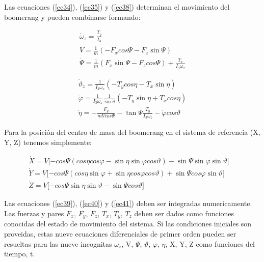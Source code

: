 	Las ecuaciones (\ref{ec34}), (\ref{ec35}) y (\ref{ec38}) determinan el movimiento del boomerang y pueden combinarse formando:

		\begin{equation}
		\begin{matrix}
		\dot{\omega}_{z}=\frac{T_{y}}{{I}_{3}}\\
		\dot{V}=\frac{1}{m}(-{F}_{x}cos{\Psi}-{F}_{z}\sin{\Psi})\\
		\dot{\Psi}=\frac{1}{m }({F}_{x}\sin{\Psi-{F}_{z}cos{\Psi}})+\frac{{T}_{x}}{{I}_{3}{\omega}_{z}}
		\end{matrix}
		\label{ec39}
		\end{equation}

		\begin{equation}
		\begin{matrix}
		 {\dot{\vartheta}}_{z}=\frac{1}{{I}_{3}{\omega}_{z}}(-{T}_{y}cos{\eta}-{T}_{x}\sin{\eta})\\
		 \dot{\varphi}=\frac{1}{{I}_{3}{\omega}_{z}}\frac{1}{\sin{\vartheta}}(-{T}_{y}\sin {\eta}+{T}_{x}cos{\eta})\\
		 \dot{\eta}=-\frac{{F}_{y}}{mVcos{\Psi}}-\tan{\Psi}\frac{T_{y}}{{I}_{3}{\omega}_{z}}-\dot{\varphi} cos{\vartheta}
		\end{matrix}
		\label{ec40}
		\end{equation}

	Para la posición del centro de masa del boomerang en el sistema de referencia (X, Y, Z) tenemos simplemente:

		\begin{equation}
		\begin{matrix}
		\dot{X} = V[{-cos{\Psi}(cos{\eta}cos{\varphi}-\sin{\eta}\sin{\varphi}cos{\vartheta})-\sin{\Psi}\sin{\varphi}\sin{\vartheta}]}\quad\\
	    \dot{Y}=V[{-cos{\Psi}\left(cos{\eta}\sin{\varphi}+\sin{\eta}cos{\varphi}cos{\vartheta}\right)+\sin{\Psi}cos{\varphi}\sin{\vartheta}]}\\
	    \dot{Z}=V[{-cos{\Psi\sin{\eta}\sin{\vartheta}-\sin{\Psi}cos{\vartheta}}]}
		\end{matrix}
		\label{ec41}
		\end{equation}

	Las ecuaciones (\ref{ec39}), (\ref{ec40}) y (\ref{ec41}) deben ser integradas numericamente. Las fuerzas y pares $F_{x}$, $F_{y}$, $F_{z}$, $T_{x}$, $T_{y}$, $T_{z}$ deben ser dados como funciones conocidas del estado de movimiento del sistema. Si las condiciones iniciales son proveidas, estas nueve ecuaciones diferenciales de primer orden pueden ser resueltas para las nueve incognitas $\omega_{z}$, V, $\Psi$, $\vartheta$, $\varphi$, $\eta$, X, Y, Z como funciones del tiempo, t.

